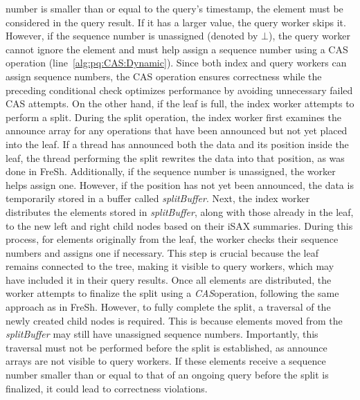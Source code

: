 \documentclass[a4paper,11pt,twoside,openany]{book}
\newcommand{\CAS}{\mbox{\textit{CAS}}}
\begin{document}
number is smaller than or equal to the query's timestamp, the element must be considered
in the query result. If it has a larger value, the query worker skips it. However, if the
sequence number is unassigned (denoted by \( \bot \)), the query worker cannot ignore
the element and must help assign a sequence number using a CAS operation
(line~\ref{alg:pq:CAS:Dynamic}). Since both index and query workers can assign sequence
numbers, the CAS operation ensures correctness while the preceding conditional
check optimizes performance by avoiding unnecessary failed CAS attempts.
%
On the other hand, if the leaf is full, the index worker attempts to perform a split.  
During the split operation, the index worker first examines the announce array
for any operations that have been announced but not yet placed into the leaf.
If a thread has announced both the data and its position inside the leaf,
the thread performing the split rewrites the data into that position,
as was done in FreSh. Additionally, if the sequence number is unassigned,
the worker helps assign one. However, if the position has not yet been announced,
the data is temporarily stored in a buffer called \textit{splitBuffer}.  
%
Next, the index worker distributes the elements stored in \textit{splitBuffer},
along with those already in the leaf, to the new left and right child nodes
based on their iSAX summaries. During this process, for elements originally
from the leaf, the worker checks their sequence numbers and assigns one
if necessary. This step is crucial because the leaf remains connected to the
tree, making it visible to query workers, which may have included it in their
query results.  
%
Once all elements are distributed, the worker attempts to finalize the split
using a \CAS operation, following the same approach as in FreSh. However,
to fully complete the split, a traversal of the newly created child nodes
is required. This is because elements moved from the \textit{splitBuffer}
may still have unassigned sequence numbers. Importantly, this traversal must
not be performed before the split is established, as announce arrays are not
visible to query workers. If these elements receive a sequence number smaller
than or equal to that of an ongoing query before the split is finalized,
it could lead to correctness violations.
% 
\end{document}
